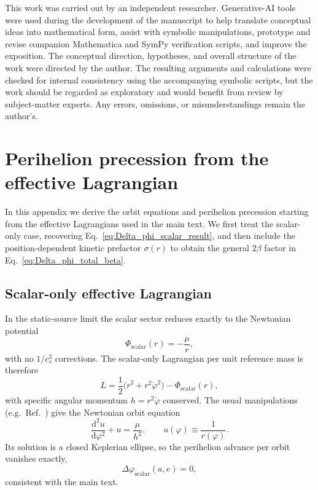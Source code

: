 \documentclass[11pt]{article}
\newcommand{\cS}{c_s}
\newcommand{\dd}{\mathrm{d}}
\begin{document}
This work was carried out by an independent researcher. Generative-AI tools were used during the development of the manuscript to help translate conceptual ideas into mathematical form, assist with symbolic manipulations, prototype and revise companion Mathematica and SymPy verification scripts, and improve the exposition. The conceptual direction, hypotheses, and overall structure of the work were directed by the author. The resulting arguments and calculations were checked for internal consistency using the accompanying symbolic scripts, but the work should be regarded as exploratory and would benefit from review by subject-matter experts. Any errors, omissions, or misunderstandings remain the author's.

\appendix

\section{Perihelion precession from the effective Lagrangian}
\label{app:precession}

In this appendix we derive the orbit equations and perihelion precession starting from the effective Lagrangians used in the main text. We first treat the scalar-only case, recovering Eq.~\eqref{eq:Delta_phi_scalar_result}, and then include the position-dependent kinetic prefactor $\sigma(r)$ to obtain the general $2\beta$ factor in Eq.~\eqref{eq:Delta_phi_total_beta}.

\subsection{Scalar-only effective Lagrangian}
\label{app:precession_scalar_only}

In the static-source limit the scalar sector reduces exactly to the Newtonian potential
\begin{equation}
  \Phi_{\mathrm{scalar}}(r) = -\frac{\mu}{r},
\end{equation}
with no $1/\cS^2$ corrections. The scalar-only Lagrangian per unit reference mass is therefore
\begin{equation}
  L
  = \frac{1}{2}\bigl(\dot{r}^2 + r^2 \dot{\varphi}^2\bigr)
    - \Phi_{\mathrm{scalar}}(r),
\end{equation}
with specific angular momentum $h = r^2 \dot{\varphi}$ conserved. The usual manipulations (e.g.\ Ref.~\cite{Goldstein}) give the Newtonian orbit equation
\begin{equation}
  \frac{\dd^2 u}{\dd \varphi^2} + u = \frac{\mu}{h^2},
  \qquad
  u(\varphi) \equiv \frac{1}{r(\varphi)}.
\end{equation}
Its solution is a closed Keplerian ellipse, so the perihelion advance per orbit vanishes exactly,
\begin{equation}
  \Delta \varphi_{\mathrm{scalar}}(a,e) = 0,
\end{equation}
consistent with the main text.
\end{document}
